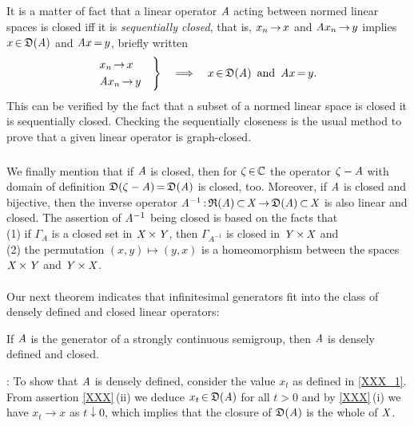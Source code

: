 \documentclass[11pt,twoside]{article}
\begin{document}
\subparagraph{} %
It is a matter of fact
that a linear operator $\mathit{A}$ acting between normed linear spaces is closed
iff it is \textit{sequentially closed},
that is,
$x_n {\,\to\,} x$ and $\mathit{A} x_n {\,\to\,} y$ implies
$x {\,\in\,} \mathfrak{D}(\mathit{A})$ and $\mathit{A} x {\,=\,} y$,
briefly written
\[
\begin{rcases}
 x_n       {\,\to\,} x \quad \\
 \mathit{A} x_n {\,\to\,} y \quad \\
\end{rcases}
\quad \Longrightarrow \quad
x {\,\in\,} \mathfrak{D}(\mathit{A}) \, \mbox{ and } \, \mathit{A} x {\,=\,} y.
\]
This can be verified by the fact
that a subset of a normed linear space is closed
\iff it is sequentially closed.
Checking the sequentially closeness is the usual method
to prove that a given linear operator is graph-closed.

\subparagraph{}
We finally mention that if $\mathit{A}$ is closed,
then for $\zeta {\,\in\,} {\mathbb{C}}$ the operator $\zeta-\mathit{A}$
with domain of definition $\mathfrak{D}(\zeta-\mathit{A}) {\,=\,} \mathfrak{D}(\mathit{A})$ is closed,
too.
Moreover,
if $\mathit{A}$ is closed and bijective,
then the inverse operator
$\mathit{A}^{-1}{\,:\,} \mathfrak{R}(\mathit{A}) {\,\subset\,} \mathit{X} {\,\to\,} \mathfrak{D}(\mathit{A}) {\,\subset\,} \mathit{X}$
is also linear and closed.
The assertion of $\mathit{A}^{-1}$ being closed is based on the facts
that\\
(1) if $\Gamma_A$ is a closed set in $\mathit{X} {\,\times\,} \mathit{Y}$,
then $\Gamma_{A^{-1}}$ is closed in $\mathit{Y} {\,\times\,} \mathit{X}$ and\\
(2) the permutation $(x,y) \mapsto (y,x)$ is a homeomorphism
between the spaces $\mathit{X} {\,\times\,} \mathit{Y}$ and $\mathit{Y} {\,\times\,} \mathit{X}$.

\paragraph{} %
Our next theorem indicates that infinitesimal generators fit into
the class of densely defined and closed linear operators:

\begin{theorem}\label{GENERATORS_ARE_DENSELY_DEFINED_AND_CLOSED}
If $\mathit{A}$ is the generator of a strongly continuous semigroup,
then $\mathit{A}$ is densely defined and closed.
\end{theorem}

\Proof:
To show that $\mathit{A}$ is densely defined,
consider the value $x_t$ as defined in \eqref{XXX_1}.
From assertion \ref{XXX}\,(ii) we deduce $x_t {\,\in\,} \mathfrak{D}(\mathit{A})$
for all $t > 0$ and by \ref{XXX}\,(i) we have $x_t \to x$ as $t \downarrow 0$,
which implies that the closure of $\mathfrak{D}(\mathit{A})$ is the whole of $\mathit{X}$.
\end{document}
